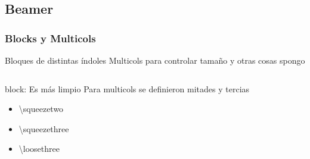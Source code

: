 
\subsection{Beamer}
	\subsubsection{Blocks y Multicols}


\begin{frame}[c]{Bloques de distintas índoles\footnotemark[1]}
				{Multicols para controlar tamaño  y otras cosas spongo}
%
\centering
	\begin{columns}
		\column{\squeezethree}
		\centering
			\begin{block}{block:  Es más limpio}
				Para multicols se  definieron mitades y tercias
				\begin{itemize} \itemsep.5em
					\item \backslash{squeezetwo}
					\item \backslash{squeezethree}
					\item \backslash{loosethree}
				\end{itemize}
			\end{block}
		\column{1.5\squeezethree}
		

\end{columns}
\end{frame}
